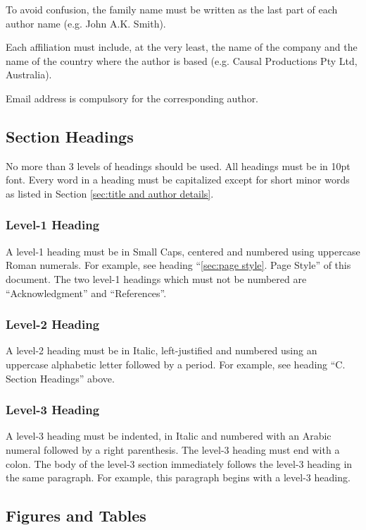 \documentclass[10pt,conference,a4paper]{IEEEtran}
\begin{document}
To avoid confusion, the family name must be written as the
last part of each author name (e.g. John A.K. Smith).

Each affiliation must include, at the very least, the name of
the company and the name of the country where the author is
based (e.g. Causal Productions Pty Ltd, Australia).

Email address is compulsory for the corresponding author.


\subsection{Section Headings}

No more than 3 levels of headings should be used.  All headings must
be in 10pt font.  Every word in a heading must be capitalized except
for short minor words as listed in Section \ref{sec:title and author
details}.

\subsubsection{Level-1 Heading}

A level-1 heading must be in Small Caps, centered and numbered using
uppercase Roman numerals.  For example, see heading ``\ref{sec:page
style}. Page Style'' of this document.  The two level-1 headings which
must not be numbered are ``Acknowledgment'' and ``References''.

\subsubsection{Level-2 Heading}

A level-2 heading must be in Italic, left-justified and numbered using
an uppercase alphabetic letter followed by a period.  For example, see
heading ``C. Section Headings'' above.

\subsubsection{Level-3 Heading}

A level-3 heading must be indented, in Italic and numbered with an
Arabic numeral followed by a right parenthesis. The level-3 heading
must end with a colon.  The body of the level-3 section immediately
follows the level-3 heading in the same paragraph.  For example, this
paragraph begins with a level-3 heading.

\subsection{Figures and Tables}
\end{document}
